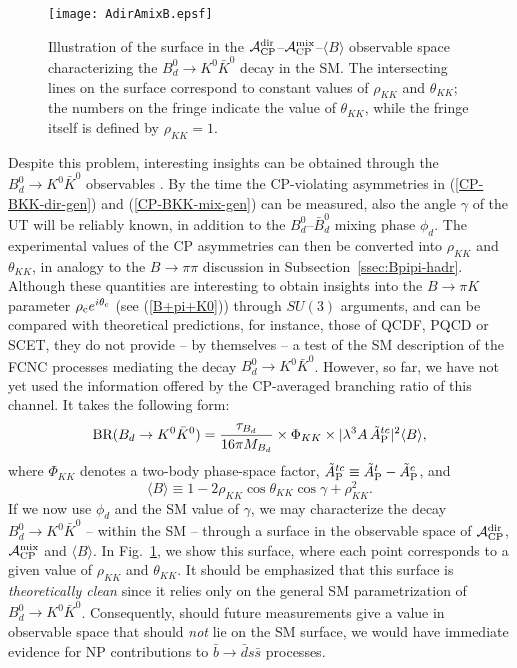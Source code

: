 \documentclass[11pt]{cernrep}
\begin{document}
\begin{figure}
\vspace*{0.3truecm}
\begin{center}
\texttt{[image: AdirAmixB.epsf]}
\end{center}
\vspace*{-0.6truecm}
\caption{Illustration of the surface in the 
${\cal A}_{\rm CP}^{\rm dir}$--${\cal A}_{\rm CP}^{\rm mix}$--$\langle B \rangle$
observable space characterizing the $B^0_d\to K^0\bar K^0$ decay in the SM. 
The intersecting lines on the surface correspond to constant 
values of $\rho_{K\!K}$ and $\theta_{K\!K}$; the numbers on the fringe indicate 
the value of $\theta_{K\!K}$, while the fringe itself is defined by 
$\rho_{K\!K}=1$.}\label{fig:SM-surface}
\end{figure}


Despite this problem, interesting insights can be obtained through the
$B^0_d\to K^0\bar K^0$ observables \cite{FR1}.
By the time the CP-violating asymmetries in (\ref{CP-BKK-dir-gen}) and 
(\ref{CP-BKK-mix-gen}) can be measured, also the angle $\gamma$ of
the UT will be reliably known, in addition to the $B^0_d$--$\bar B^0_d$
mixing phase $\phi_d$. The experimental values of the CP asymmetries
can then be converted into $\rho_{K\!K}$ and $\theta_{K\!K}$, in analogy
to the $B\to\pi\pi$ discussion in Subsection~\ref{ssec:Bpipi-hadr}. Although 
these quantities are interesting to obtain insights into the $B\to\pi K$
parameter $\rho_{\rm c}e^{i\theta_{\rm c}}$ (see (\ref{B+pi+K0}))
through $SU(3)$ arguments, and can be compared  with theoretical predictions,  
for instance, those of QCDF, PQCD or SCET, they do not 
provide -- by themselves -- a test of the SM description of the 
FCNC processes mediating the decay $B^0_d\to K^0\bar K^0$. However, so far, 
we have not yet used the information offered by the CP-averaged branching 
ratio of this channel. It takes the following form:
\begin{equation}\label{BR-BKK-expr}
\mbox{BR}(B_d\to K^0\bar K^0)=\frac{\tau_{B_d}}{16\pi M_{B_d}}
\times \Phi_{KK} \times
|\lambda^3 A \, \tilde A_{\rm P}^{tc}|^2 \langle B \rangle,
\end{equation}
where $\Phi_{KK}$ denotes a two-body phase-space factor, 
$\tilde A_{\rm P}^{tc}\equiv \tilde A_{\rm P}^t-\tilde A_{\rm P}^c$, and
\begin{equation}\label{B-DEF}
\langle B \rangle\equiv 1-2\rho_{K\!K}\cos\theta_{K\!K}
\cos\gamma+\rho_{K\!K}^2.
\end{equation}
If we now use $\phi_d$ and the SM value of $\gamma$, we may characterize
the decay $B^0_d\to K^0\bar K^0$ -- within the SM -- through a surface in 
the observable space of ${\cal A}_{\rm CP}^{\rm dir}$, 
${\cal A}_{\rm CP}^{\rm mix}$ and $\langle B \rangle$. In 
Fig.~\ref{fig:SM-surface}, we show this surface, where each point 
corresponds to a given value of $\rho_{K\!K}$ and $\theta_{K\!K}$. It should 
be emphasized that this surface is {\it theoretically clean} since it 
relies only on the general SM parametrization of $B^0_d\to K^0\bar K^0$. 
Consequently, should future measurements give a value in observable space 
that should {\it not} lie on the SM surface, we would have immediate evidence 
for NP contributions to $\bar b\to \bar d s \bar s$ processes. 
\end{document}
